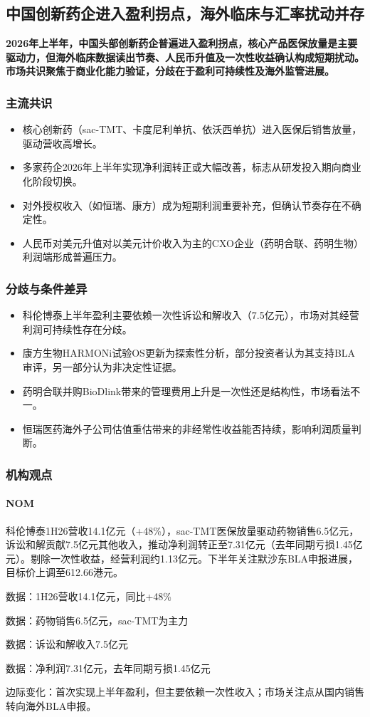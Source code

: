 \documentclass[11pt]{ctexart}
\begin{document}
\subsection{中国创新药企进入盈利拐点，海外临床与汇率扰动并存}
\textbf{2026年上半年，中国头部创新药企普遍进入盈利拐点，核心产品医保放量是主要驱动力，但海外临床数据读出节奏、人民币升值及一次性收益确认构成短期扰动。市场共识聚焦于商业化能力验证，分歧在于盈利可持续性及海外监管进展。}
\subsubsection*{主流共识}
\begin{itemize}
  \item 核心创新药（sac-TMT、卡度尼利单抗、依沃西单抗）进入医保后销售放量，驱动营收高增长。
  \item 多家药企2026年上半年实现净利润转正或大幅改善，标志从研发投入期向商业化阶段切换。
  \item 对外授权收入（如恒瑞、康方）成为短期利润重要补充，但确认节奏存在不确定性。
  \item 人民币对美元升值对以美元计价收入为主的CXO企业（药明合联、药明生物）利润端形成普遍压力。
\end{itemize}
\subsubsection*{分歧与条件差异}
\begin{itemize}
  \item 科伦博泰上半年盈利主要依赖一次性诉讼和解收入（7.5亿元），市场对其经营利润可持续性存在分歧。
  \item 康方生物HARMONi试验OS更新为探索性分析，部分投资者认为其支持BLA审评，另一部分认为非决定性证据。
  \item 药明合联并购BioDlink带来的管理费用上升是一次性还是结构性，市场看法不一。
  \item 恒瑞医药海外子公司估值重估带来的非经常性收益能否持续，影响利润质量判断。
\end{itemize}
\subsubsection*{机构观点}
\paragraph{NOM} 科伦博泰1H26营收14.1亿元（+48\%），sac-TMT医保放量驱动药物销售6.5亿元，诉讼和解贡献7.5亿元其他收入，推动净利润转正至7.31亿元（去年同期亏损1.45亿元）。剔除一次性收益，经营利润约1.13亿元。下半年关注默沙东BLA申报进展，目标价上调至612.66港元。
{\small\color{refgray}数据：1H26营收14.1亿元，同比+48\%\par}
{\small\color{refgray}数据：药物销售6.5亿元，sac-TMT为主力\par}
{\small\color{refgray}数据：诉讼和解收入7.5亿元\par}
{\small\color{refgray}数据：净利润7.31亿元，去年同期亏损1.45亿元\par}
{\small\color{refgray}边际变化：首次实现上半年盈利，但主要依赖一次性收入；市场关注点从国内销售转向海外BLA申报。\par}
\end{document}
